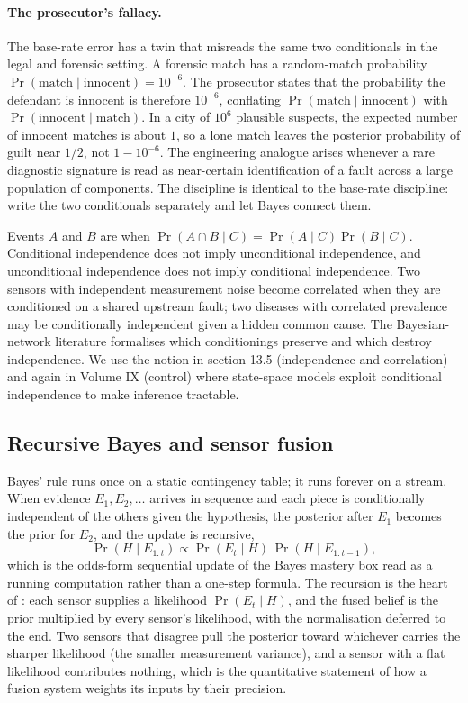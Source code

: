 \paragraph{The prosecutor's fallacy.} The base-rate error has a
twin that misreads the same two conditionals in the legal and
forensic setting. A forensic match has a random-match probability
$\Pr(\text{match} \mid \text{innocent}) = 10^{-6}$. The prosecutor
states that the probability the defendant is innocent is therefore
$10^{-6}$, conflating $\Pr(\text{match} \mid \text{innocent})$ with
$\Pr(\text{innocent} \mid \text{match})$. In a city of $10^{6}$
plausible suspects, the expected number of innocent matches is
about $1$, so a lone match leaves the posterior probability of guilt
near $1/2$, not $1 - 10^{-6}$. The engineering analogue arises
whenever a rare diagnostic signature is read as near-certain
identification of a fault across a large population of components.
The discipline is identical to the base-rate discipline: write the
two conditionals separately and let Bayes connect them.

Events $A$ and $B$ are  when $\Pr(A \cap B \mid C) = \Pr(A \mid C) \Pr(B \mid C)$.
Conditional independence does not imply unconditional independence,
and unconditional independence does not imply conditional
independence. Two sensors with independent measurement noise
become correlated when they are conditioned on a shared upstream
fault; two diseases with correlated prevalence may be conditionally
independent given a hidden common cause. The Bayesian-network
literature \cite[ch.~11]{text:wasserman2004} formalises which
conditionings preserve and which destroy independence. We use the
notion in section 13.5 (independence and correlation) and again in
Volume IX (control) where state-space models exploit conditional
independence to make inference tractable.

\subsection{Recursive Bayes and sensor fusion}

Bayes' rule runs once on a static contingency table; it runs forever on
a stream. When evidence $E_{1}, E_{2}, \ldots$ arrives in sequence and
each piece is conditionally independent of the others given the
hypothesis, the posterior after $E_{1}$ becomes the prior for $E_{2}$,
and the update is recursive,
\[
\Pr(H \mid E_{1:t}) \propto \Pr(E_{t} \mid H)\,
\Pr(H \mid E_{1:t-1}),
\]
which is the odds-form sequential update of the Bayes mastery box read
as a running computation rather than a one-step formula. The recursion
is the heart of : each sensor supplies a
likelihood $\Pr(E_{t} \mid H)$, and the fused belief is the prior
multiplied by every sensor's likelihood, with the normalisation deferred
to the end. Two sensors that disagree pull the posterior toward whichever
carries the sharper likelihood (the smaller measurement variance), and a
sensor with a flat likelihood contributes nothing, which is the
quantitative statement of how a fusion system weights its inputs by
their precision.

